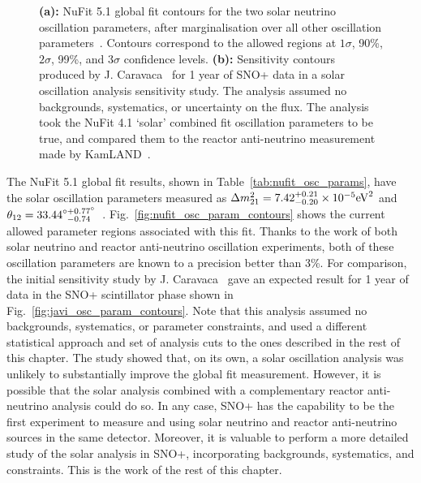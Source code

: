 \begin{figure}[!th]
    {\textbf{(a):} NuFit 5.1 global fit contours for the two solar neutrino oscillation parameters, after marginalisation over all other oscillation parameters~\cite{estebanFateHintsUpdated2020}. Contours correspond to the allowed regions at $1\sigma$, 90\%, $2\sigma$, 99\%, and $3\sigma$ confidence levels. \textbf{(b):} Sensitivity contours produced by J. Caravaca~\cite{caravacaSNOSensitivityStandard2020} for 1 year of SNO+ data in a solar oscillation analysis sensitivity study. The analysis assumed no backgrounds, systematics, or uncertainty on the \beight{} flux. The analysis took the NuFit 4.1 `solar' combined fit oscillation parameters to be true, and compared them to the reactor anti-neutrino measurement made by KamLAND~\cite{gandoReactorOnoffAntineutrino2013}.}
    \label{fig:previous_solar_osc_results}
\end{figure}

The NuFit 5.1 global fit results, shown in Table~\ref{tab:nufit_osc_params}, have the solar oscillation parameters measured as $\dmsq = 7.42^{+0.21}_{-0.20}\times10^{-5}\si{\eV\squared}$ and $\theta_{12} = 33.44^{\circ+0.77^{\circ}}_{\phantom{\circ}-0.74}$~\cite{estebanFateHintsUpdated2020}. Fig.~\ref{fig:nufit_osc_param_contours} %
shows the current allowed parameter regions associated with this fit. Thanks to the work of both solar neutrino and reactor anti-neutrino oscillation experiments, both of these oscillation parameters are known to a precision better than 3\%. For comparison, the initial sensitivity study by J. Caravaca~\cite{caravacaSNOSensitivityStandard2020} gave an expected result for 1 year of data in the SNO+ scintillator phase shown in Fig.~\ref{fig:javi_osc_param_contours}. Note that this analysis assumed no backgrounds, systematics, or parameter constraints, and used a different statistical approach and set of analysis cuts to the ones described in the rest of this chapter. The study showed that, on its own, a solar oscillation analysis was unlikely to substantially improve the global fit measurement. However, it is possible that the solar analysis combined with a complementary reactor anti-neutrino analysis could do so. In any case, SNO+ has the capability to be the first experiment to measure \tonetwo{} and \dmsq{} using solar neutrino and reactor anti-neutrino sources in the same detector. Moreover, it is valuable to perform a more detailed study of the solar analysis in SNO+, incorporating backgrounds, systematics, and constraints. This is the work of the rest of this chapter.

